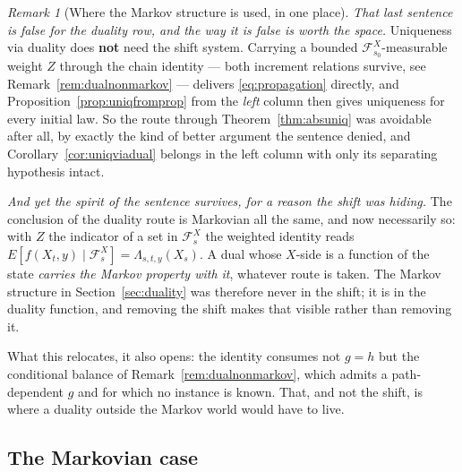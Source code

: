 \documentclass[11pt,a4paper]{article}
\theoremstyle{plain}
\theoremstyle{definition}
\theoremstyle{remark}
\newtheorem{remark}[theorem]{Remark}
\newcommand{\Filt}{\mathcal{F}}
\begin{document}
\begin{remark}[Where the Markov structure is used, in one place]
  \emph{That last sentence is false for the duality row, and the way it is false
  is worth the space.}  Uniqueness via duality does \textbf{not} need the shift
  system.  Carrying a bounded $\Filt^X_{s_0}$-measurable weight $Z$ through the
  chain identity --- both increment relations survive, see
  Remark~\ref{rem:dualnonmarkov} --- delivers \eqref{eq:propagation} directly,
  and Proposition~\ref{prop:uniqfromprop} from the \emph{left} column then gives
  uniqueness for every initial law.  So the route through
  Theorem~\ref{thm:absuniq} was avoidable after all, by exactly the kind of
  better argument the sentence denied, and
  Corollary~\ref{cor:uniqviadual} belongs in the left column with only its
  separating hypothesis intact.

  \emph{And yet the spirit of the sentence survives, for a reason the shift was
  hiding.}  The conclusion of the duality route is Markovian all the same, and
  now necessarily so: with $Z$ the indicator of a set in $\Filt^X_s$ the weighted
  identity reads $E[f(X_t,y) \mid \Filt^X_s] = \Lambda_{s,t,y}(X_s)$.  A dual
  whose $X$-side is a function of the state \emph{carries the Markov property
  with it}, whatever route is taken.  The Markov structure in
  Section~\ref{sec:duality} was therefore never in the shift; it is in the
  duality function, and removing the shift makes that visible rather than
  removing it.

  What this relocates, it also opens: the identity consumes not $g = h$ but the
  conditional balance of Remark~\ref{rem:dualnonmarkov}, which admits a
  path-dependent $g$ and for which no instance is known.  That, and not the
  shift, is where a duality outside the Markov world would have to live.
\end{remark}

\subsection{The Markovian case}
\label{ssec:uniqmarkov}
\end{document}
